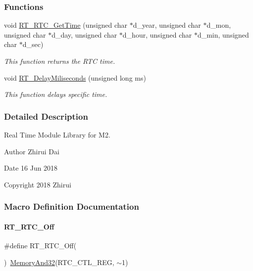 \subsubsection*{Functions}
\begin{DoxyCompactItemize}
\item 
void \mbox{\hyperlink{a00053_ae30dec10f77cab56a66ee070fbe6a490}{R\+T\+\_\+\+R\+T\+C\+\_\+\+Get\+Time}} (unsigned char $\ast$d\+\_\+year, unsigned char $\ast$d\+\_\+mon, unsigned char $\ast$d\+\_\+day, unsigned char $\ast$d\+\_\+hour, unsigned char $\ast$d\+\_\+min, unsigned char $\ast$d\+\_\+sec)
\begin{DoxyCompactList}\small\item\em This function returns the R\+TC time. \end{DoxyCompactList}\item 
void \mbox{\hyperlink{a00053_a960534919351d6e419e70a78521e87da}{R\+T\+\_\+\+Delay\+Miliseconds}} (unsigned long ms)
\begin{DoxyCompactList}\small\item\em This function delays specific time. \end{DoxyCompactList}\end{DoxyCompactItemize}


\subsubsection{Detailed Description}
Real Time Module Library for M2. 

\begin{DoxyAuthor}{Author}
Zhirui Dai 
\end{DoxyAuthor}
\begin{DoxyDate}{Date}
16 Jun 2018 
\end{DoxyDate}
\begin{DoxyCopyright}{Copyright}
2018 Zhirui 
\end{DoxyCopyright}


\subsubsection{Macro Definition Documentation}
\mbox{\label{a00053_ad065bdfa3138a773950a7d5e9e9f863a}} 
\paragraph{\texorpdfstring{R\+T\+\_\+\+R\+T\+C\+\_\+\+Off}{RT\_RTC\_Off}}
{\footnotesize\ttfamily \#define R\+T\+\_\+\+R\+T\+C\+\_\+\+Off(\begin{DoxyParamCaption}{ }\end{DoxyParamCaption})~\mbox{\hyperlink{a00020_ad87cedffcaadc51db22594fce55173d4}{Memory\+And32}}(R\+T\+C\+\_\+\+C\+T\+L\+\_\+\+R\+EG, $\sim$1)}



